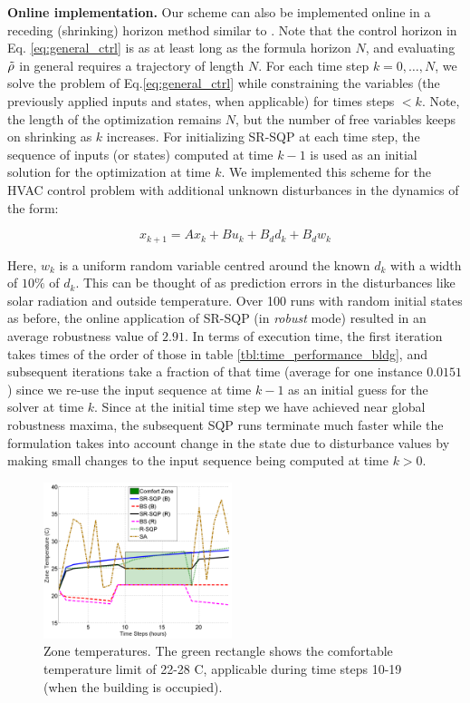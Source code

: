 \textbf{Online implementation.} Our scheme can also be implemented online in a receding (shrinking) horizon method similar to \cite{Raman14_MPCSTL}. Note that the control horizon in Eq. \ref{eq:general_ctrl} is as at least long as the formula horizon $N$, and evaluating $\tilde{\rho}$ in general requires a trajectory of length $N$. 
For each time step $k=0,\dotsc,N$, we solve the problem of Eq.\ref{eq:general_ctrl} while constraining the variables (the previously applied inputs and states, when applicable) for times steps $<k$. Note, the length of the optimization remains $N$, but the number of free variables keeps on shrinking as $k$ increases. For initializing SR-SQP at each time step, the sequence of inputs (or states) computed at time $k-1$ is used as an initial solution for the optimization at time $k$. 
We implemented this scheme for the HVAC control problem with additional unknown disturbances in the dynamics of the form:
  
\begin{equation}
\label{eq:bldg_dyn_noisy}
x_{k+1} = Ax_{k}+Bu_k+B_dd_k+B_dw_k
\end{equation}

Here, $w_k$ is a uniform random variable centred around the known $d_k$ with a width of $10\%$ of $d_k$. This can be thought of as prediction errors in the disturbances like solar radiation and outside temperature. Over 100 runs with random initial states as before, the online application of SR-SQP (in \textit{robust} mode) resulted in an average robustness value of $2.91$. In terms of execution time, the first iteration takes times of the order of those in table \ref{tbl:time_performance_bldg}, and subsequent iterations take a fraction of that time (average for one instance $0.0151$) since we re-use the input sequence at time $k-1$ as an initial guess for the solver at time $k$. Since at the initial time step we have achieved near global robustness maxima, the subsequent SQP runs terminate much faster while the formulation takes into account change in the state due to disturbance values by making small changes to the input sequence being computed at time $k>0$. 

\begin{figure}[t]
\centering
\includegraphics[width=0.49\textwidth]{figures/ZoneTemp_all_scissored}
\vspace{-20pt}
\caption{\small{Zone temperatures. The green rectangle shows the comfortable temperature limit of 22-28 C, applicable during time steps 10-19 (when the building is occupied).}}
\label{fig:ZoneTemp}
\vspace{-10pt}
\end{figure}

